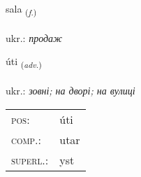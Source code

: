 \documentclass[frontgrid, backgrid]{flacards}\usepackage[]{graphicx}\usepackage[]{xcolor}
\begin{document}
\renewcommand{\flhead}{\vskip5pt \fboxsep=0pt {\small\bfseries\footnotesize Nafnorð | іменник}}
\renewcommand{\fcfoot}{\vskip5pt \fboxsep=0pt \hspace{2pt}{\small\bfseries\footnotesize 1K}}

\renewcommand{\blhead}{\vskip5pt {\small\bfseries\footnotesize Nafnorð | іменник }}
\renewcommand{\bcfoot}{\vskip5pt \hspace{2pt}{\small\bfseries\footnotesize 1K}}


{sala \small{\textsubscript{(\textit{f.})}} \\[1ex] %
\textphonetic{[saːla]} \\
ukr.: \emph{продаж} \\  [2ex]
\renewcommand*{\arraystretch}{0.8}
}

\renewcommand{\flhead}{\vskip5pt \fboxsep=0pt {\small\bfseries\footnotesize Atviksorð | прислівник}}
\renewcommand{\fcfoot}{\vskip5pt \fboxsep=0pt \hspace{2pt}{\small\bfseries\footnotesize 1K}}

\renewcommand{\blhead}{\vskip5pt {\small\bfseries\footnotesize Atviksorð | прислівник }}
\renewcommand{\bcfoot}{\vskip5pt \hspace{2pt}{\small\bfseries\footnotesize 1K}}


{úti \small{\textsubscript{(\textit{adv.})}} \\[1ex] %
\textphonetic{[uːtɪ]} \\
ukr.: \emph{зовні; на дворі; на вулиці} \\  [2ex]
\renewcommand*{\arraystretch}{0.8}
\begin{tabular}{ll}
\textsc{pos}: & úti \\ 
\textsc{comp.}: & utar \\ 
\textsc{superl.}: & yst \\
\end{tabular}
}
\end{document}
